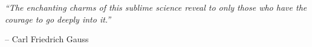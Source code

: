 \documentclass[a4paper, 11pt, oneside]{Thesis}  %
\newcommand{\brk}{\vspace*{0.18in}}
\begin{document}
%





\pagestyle{empty}  %

\null\vfill
\textit{``The enchanting charms of this sublime science reveal to only those who have the courage to go deeply into it.''}

\begin{flushright}
-- Carl Friedrich Gauss
\end{flushright}

\vfill\vfill\vfill\vfill\vfill\vfill\null
\clearpage  %
\end{document}
